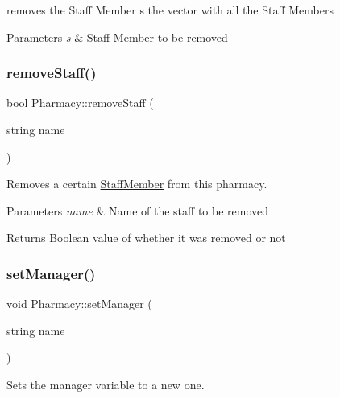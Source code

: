 removes the Staff Member s the vector with all the Staff Members 


\begin{DoxyParams}{Parameters}
{\em s} & Staff Member to be removed \\
\hline
\end{DoxyParams}
\mbox{\label{classPharmacy_a1fe770db0e60d644098750463cb2b8ee}} 
\subsubsection{\texorpdfstring{remove\+Staff()}{removeStaff()}\hspace{0.1cm}{\footnotesize\ttfamily [2/2]}}
{\footnotesize\ttfamily bool Pharmacy\+::remove\+Staff (\begin{DoxyParamCaption}\item[{string}]{name }\end{DoxyParamCaption})}



Removes a certain \hyperlink{classStaffMember}{Staff\+Member} from this pharmacy. 


\begin{DoxyParams}{Parameters}
{\em name} & Name of the staff to be removed\\
\hline
\end{DoxyParams}
\begin{DoxyReturn}{Returns}
Boolean value of whether it was removed or not 
\end{DoxyReturn}
\mbox{\label{classPharmacy_a5c153e1ed72cfd0f824d43a1660c338d}} 
\subsubsection{\texorpdfstring{set\+Manager()}{setManager()}}
{\footnotesize\ttfamily void Pharmacy\+::set\+Manager (\begin{DoxyParamCaption}\item[{string}]{name }\end{DoxyParamCaption})}



Sets the manager variable to a new one. 


